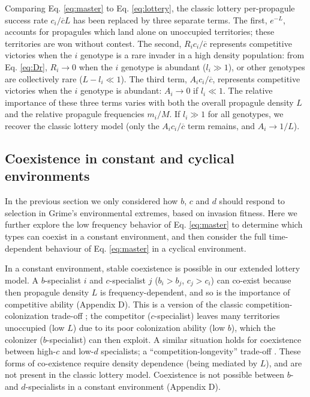 \documentclass[11pt]{article}
\begin{document}
Comparing Eq. \eqref{eq:master} to Eq. \eqref{eq:lottery}, the classic lottery per-propagule success rate $c_i/\overline{c}L$ has been replaced by three separate terms. The first, $e^{-L}$, accounts for propagules which land alone on unoccupied territories; these territories are won without contest. The second, $R_i c_i/\overline{c}$ represents competitive victories when the $i$ genotype is a rare invader in a high density population: from Eq. \eqref{eq:Dr}, $R_i\rightarrow 0$ when the $i$ genotype is abundant ($l_i\gg 1$), or other genotypes are collectively rare ($L-l_i\ll 1$). The third term, $A_ic_i/\overline{c}$, represents competitive victories when the $i$ genotype is abundant: $A_i\rightarrow 0$ if $l_i\ll 1$. The relative importance of these three terms varies with both the overall propagule density $L$ and the relative propagule frequencies $m_i/M$. If $l_i\gg 1$ for all genotypes, we recover the classic lottery model (only the $A_ic_i/\overline{c}$ term remains, and $A_i\rightarrow 1/L$). 

\subsection*{Coexistence in constant and cyclical environments}\label{sec:invas}

In the previous section we only considered how $b$, $c$ and $d$ should respond to selection in Grime's environmental extremes, based on invasion fitness. Here we further explore the low frequency behavior of Eq. \eqref{eq:master} to determine which types can coexist in a constant environment, and then consider the full time-dependent behaviour of Eq. \eqref{eq:master} in a cyclical environment. 

In a constant environment, stable coexistence is possible in our extended lottery model. A $b$-specialist $i$ and $c$-specialist $j$ ($b_i>b_j$, $c_j>c_i$) can co-exist because then propagule density $L$ is frequency-dependent, and so is the importance of competitive ability (Appendix D). This is a version of the classic competition-colonization trade-off \citep{tilman_94,levins_71}; the competitor ($c$-specialist) leaves many territories unoccupied (low $L$) due to its poor colonization ability (low $b$), which the colonizer ($b$-specialist) can then exploit. A similar situation holds for coexistence between high-$c$ and low-$d$ specialists; a ``competition-longevity'' trade-off \citep{tilman_94}. These forms of co-existence require density dependence (being mediated by $L$), and are not present in the classic lottery model. Coexistence is not possible between $b$- and $d$-specialists in a constant environment (Appendix D). 
\end{document}
